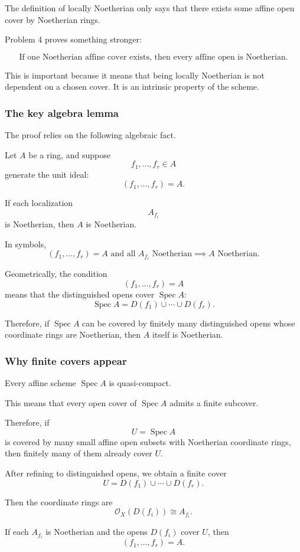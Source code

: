 \documentclass[12pt,a4paper]{article}
\DeclareMathOperator{\Spec}{Spec}
\newcommand{\OO}{\mathcal{O}}
\providecommand{\Spec}{\operatorname{Spec}}
\theoremstyle{notespace}
\begin{document}
The definition of locally Noetherian only says that there exists some affine open cover by Noetherian rings.

Problem 4 proves something stronger:

\[
\boxed{
	\text{If one Noetherian affine cover exists, then every affine open is Noetherian.}
}
\]

This is important because it means that being locally Noetherian is not dependent on a chosen cover. It is an intrinsic property of the scheme.

\subsubsection*{The key algebra lemma}

The proof relies on the following algebraic fact.

Let \(A\) be a ring, and suppose
\[
f_1,\dots,f_r\in A
\]
generate the unit ideal:
\[
(f_1,\dots,f_r)=A.
\]

If each localization
\[
A_{f_i}
\]
is Noetherian, then \(A\) is Noetherian.

In symbols,
\[
\boxed{
	(f_1,\dots,f_r)=A
	\text{ and all }A_{f_i}\text{ Noetherian}
	\implies
	A\text{ Noetherian}.
}
\]

Geometrically, the condition
\[
(f_1,\dots,f_r)=A
\]
means that the distinguished opens cover \(\Spec A\):
\[
\Spec A=D(f_1)\cup\cdots\cup D(f_r).
\]

Therefore, if \(\Spec A\) can be covered by finitely many distinguished opens whose coordinate rings are Noetherian, then \(A\) itself is Noetherian.

\subsubsection*{Why finite covers appear}

Every affine scheme \(\Spec A\) is quasi-compact.

This means that every open cover of \(\Spec A\) admits a finite subcover.

Therefore, if
\[
U=\Spec A
\]
is covered by many small affine open subsets with Noetherian coordinate rings, then finitely many of them already cover \(U\).

After refining to distinguished opens, we obtain a finite cover
\[
U=D(f_1)\cup\cdots\cup D(f_r).
\]

Then the coordinate rings are
\[
\OO_X(D(f_i))\cong A_{f_i}.
\]

If each \(A_{f_i}\) is Noetherian and the opens \(D(f_i)\) cover \(U\), then
\[
(f_1,\dots,f_r)=A.
\]
\end{document}
